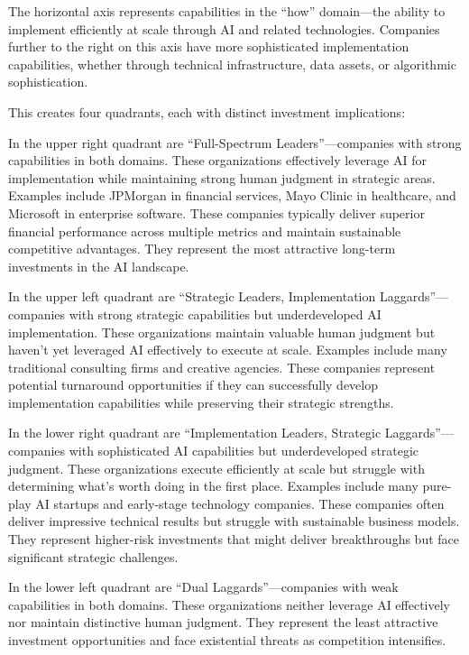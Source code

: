 \documentclass[
  Letterpaper,
]{scrbook}
\begin{document}
The horizontal axis represents capabilities in the ``how'' domain---the
ability to implement efficiently at scale through AI and related
technologies. Companies further to the right on this axis have more
sophisticated implementation capabilities, whether through technical
infrastructure, data assets, or algorithmic sophistication.

This creates four quadrants, each with distinct investment implications:

In the upper right quadrant are ``Full-Spectrum Leaders''---companies
with strong capabilities in both domains. These organizations
effectively leverage AI for implementation while maintaining strong
human judgment in strategic areas. Examples include JPMorgan in
financial services, Mayo Clinic in healthcare, and Microsoft in
enterprise software. These companies typically deliver superior
financial performance across multiple metrics and maintain sustainable
competitive advantages. They represent the most attractive long-term
investments in the AI landscape.

In the upper left quadrant are ``Strategic
Leaders, Implementation
Laggards''---companies with strong strategic capabilities but
underdeveloped AI implementation. These organizations maintain valuable
human judgment but haven't yet leveraged AI effectively to execute at
scale. Examples include many traditional consulting firms and creative
agencies. These companies represent potential turnaround opportunities
if they can successfully develop implementation capabilities while
preserving their strategic strengths.

In the lower right quadrant are ``Implementation
Leaders, Strategic
Laggards''---companies with sophisticated AI capabilities but
underdeveloped strategic judgment. These organizations execute
efficiently at scale but struggle with determining what's worth doing in
the first place. Examples include many pure-play AI startups and
early-stage technology companies. These companies often deliver
impressive technical results but struggle with sustainable business
models. They represent higher-risk investments that might deliver
breakthroughs but face significant strategic challenges.

In the lower left quadrant are ``Dual
Laggards''---companies with weak
capabilities in both domains. These organizations neither leverage AI
effectively nor maintain distinctive human judgment. They represent the
least attractive investment opportunities and face existential threats
as competition intensifies.
\end{document}
